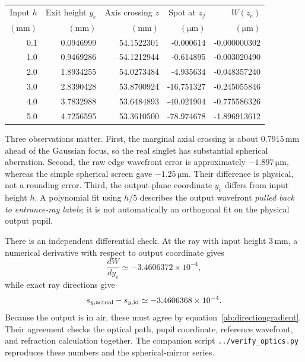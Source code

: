 \begin{center}
\small
\begin{tabular}{rrrrr}
\toprule
Input $h$ & Exit height $y_e$ & Axis crossing $z$ & Spot at $z_f$ & $W(z_e)$\\
$(\mathrm{mm})$ & $(\mathrm{mm})$ & $(\mathrm{mm})$ & $(\mathrm{\mu m})$ & $(\mathrm{\mu m})$\\
\midrule
0.1 &0.0946999&54.1522301&-0.000614&-0.000000302\\
1.0 &0.9469286&54.1212944&-0.614895&-0.003020490\\
2.0 &1.8934255&54.0273484&-4.935634&-0.048357240\\
3.0 &2.8390428&53.8700924&-16.751327&-0.245055846\\
4.0 &3.7832988&53.6484893&-40.021904&-0.775586326\\
5.0 &4.7256595&53.3610500&-78.974678&-1.896913612\\
\bottomrule
\end{tabular}
\end{center}

Three observations matter. First, the marginal axial crossing is about
$0.7915\,\mathrm{mm}$ ahead of the Gaussian focus, so the real singlet
has substantial spherical aberration. Second, the raw edge wavefront error
is approximately $-1.897\,\mathrm{\mu m}$, whereas the simple spherical
screen gave $-1.25\,\mathrm{\mu m}$. Their difference is physical, not a
rounding error. Third, the output-plane coordinate $y_e$ differs from input
height $h$. A polynomial fit using $h/5$ describes the output wavefront
\emph{pulled back to entrance-ray labels}; it is not automatically an
orthogonal fit on the physical output pupil.

There is an independent differential check. At the ray with input height
$3\,\mathrm{mm}$, a numerical derivative with respect to output coordinate
gives
\begin{equation}
 \frac{dW}{dy_e}\simeq-3.4606372\times10^{-4},
\end{equation}
while exact ray directions give
\begin{equation}
 s_{y,\rm actual}-s_{y,\rm id}
       \simeq-3.4606368\times10^{-4}.
\end{equation}
Because the output is in air, these must agree by
equation~\eqref{ab:directiongradient}. Their agreement checks the optical
path, pupil coordinate, reference wavefront, and refraction calculation
together. The companion script \texttt{../verify\_optics.py} reproduces these
numbers and the spherical-mirror series.

